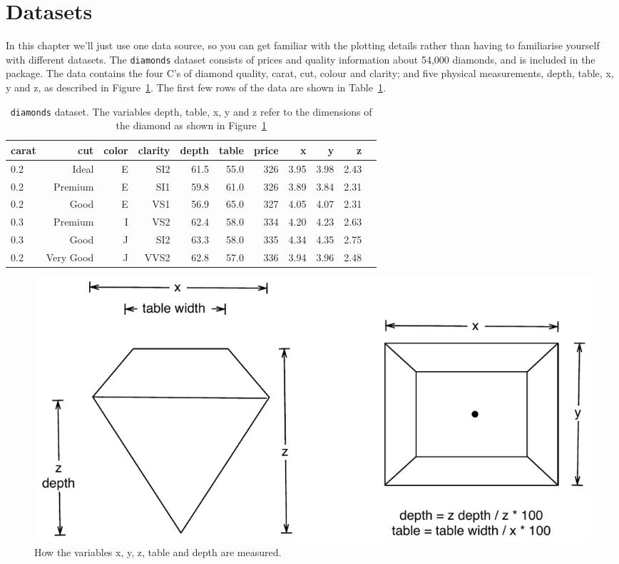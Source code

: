 \section{Datasets}\label{sec:data_sets}

In this chapter we'll just use one data source, so you can get familiar with the plotting details rather than having to familiarise yourself with different datasets. The {\tt diamonds} dataset consists of prices and quality information about 54,000 diamonds, and is included in the \ggplot package. The data contains the four C's of diamond quality, carat, cut, colour and clarity; and five physical measurements, depth, table, x, y and z, as described in Figure~\ref{fig:diamond-dim}.  The first few rows of the data are shown in Table~\ref{tab:diamonds}.

\begin{table}[ht]
\begin{center}
\begin{tabular}{lrrrrrrrrrr}
  \toprule
  carat & cut & color & clarity & depth & table & price & x & y & z \\
  \midrule
  0.2 & Ideal & E & SI2 & 61.5 & 55.0 & 326 & 3.95 & 3.98 & 2.43 \\
  0.2 & Premium & E & SI1 & 59.8 & 61.0 & 326 & 3.89 & 3.84 & 2.31 \\
  0.2 & Good & E & VS1 & 56.9 & 65.0 & 327 & 4.05 & 4.07 & 2.31 \\
  0.3 & Premium & I & VS2 & 62.4 & 58.0 & 334 & 4.20 & 4.23 & 2.63 \\
  0.3 & Good & J & SI2 & 63.3 & 58.0 & 335 & 4.34 & 4.35 & 2.75 \\
  0.2 & Very Good & J & VVS2 & 62.8 & 57.0 & 336 & 3.94 & 3.96 & 2.48 \\
  \bottomrule
\end{tabular}
\caption{{\tt diamonds} dataset.  The variables depth, table, x, y and z refer to the dimensions of the diamond as shown in Figure~\ref{fig:diamond-dim}}
\label{tab:diamonds}
\end{center}
\end{table}

\begin{figure}[htbp]
  \centering
    \includegraphics[width=0.8\linewidth]{diamond-dimensions}
  \caption{How the variables x, y, z, table and depth are measured.}
  \label{fig:diamond-dim}
\end{figure}

